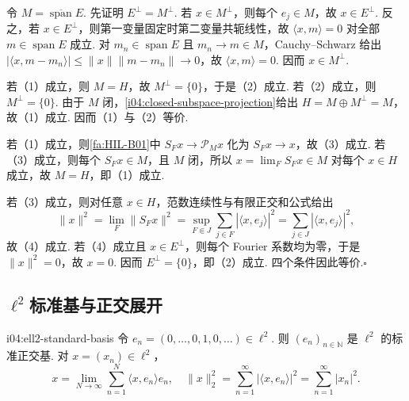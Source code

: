 \begin{FAProof}
令 \(\displaystyle M=\overline{\operatorname{span}}E\). 先证明 \(\displaystyle E^\perp=M^\perp\). 若 \(\displaystyle x\in M^\perp\)，则每个 \(\displaystyle e_j\in M\)，故 \(\displaystyle x\in E^\perp\). 反之，若 \(\displaystyle x\in E^\perp\)，则第一变量固定时第二变量共轭线性，故 \(\displaystyle \langle x,m\rangle=0\) 对全部 \(\displaystyle m\in\operatorname{span}E\) 成立. 对 \(\displaystyle m_n\in\operatorname{span}E\) 且 \(\displaystyle m_n\to m\in M\)，Cauchy--Schwarz 给出 \(\displaystyle |\langle x,m-m_n\rangle|\leqslant\|x\|\|m-m_n\|\to0\)，故 \(\displaystyle \langle x,m\rangle=0\). 因而 \(\displaystyle x\in M^\perp\).

若（1）成立，则 \(\displaystyle M=H\)，故 \(\displaystyle M^\perp=\{0\}\)，于是（2）成立. 若（2）成立，则 \(\displaystyle M^\perp=\{0\}\). 由于 \(\displaystyle M\) 闭，\autoref{i04:closed-subspace-projection}给出 \(\displaystyle H=M\oplus M^\perp=M\)，故（1）成立. 因而（1）与（2）等价.

若（1）成立，则\autoref{fa:HIL-B01}中 \(\displaystyle S_Fx\to\mathcal P_Mx\) 化为 \(\displaystyle S_Fx\to x\)，故（3）成立. 若（3）成立，则每个 \(\displaystyle S_Fx\in M\)，且 \(\displaystyle M\) 闭，所以 \(\displaystyle x=\lim_FS_Fx\in M\) 对每个 \(\displaystyle x\in H\) 成立，故 \(\displaystyle M=H\)，即（1）成立.

若（3）成立，则对任意 \(\displaystyle x\in H\)，范数连续性与有限正交和公式给出
\[
\|x\|^2
=\lim_F\|S_Fx\|^2
=\sup_{F\Subset J}\sum_{j\in F}|\langle x,e_j\rangle|^2
=\sum_{j\in J}|\langle x,e_j\rangle|^2,
\]
故（4）成立. 若（4）成立且 \(\displaystyle x\in E^\perp\)，则每个 Fourier 系数均为零，于是 \(\displaystyle \|x\|^2=0\)，故 \(\displaystyle x=0\). 因而 \(\displaystyle E^\perp=\{0\}\)，即（2）成立. 四个条件因此等价.\hfill\(\square\)

\end{FAProof}

\subsection{\texorpdfstring{\(\displaystyle\ell^2\)}{ℓ^2}标准基与正交展开}

\begin{FAProposition}{i04:ell2-standard-basis}
令 \(\displaystyle e_n=(0,\dots,0,1,0,\dots)\in\ell^2\). 则 \(\displaystyle (e_n)_{n\in\mathbb N}\) 是 \(\displaystyle \ell^2\) 的标准正交基. 对 \(\displaystyle x=(x_n)\in\ell^2\)，
\[
x=\lim_{N\to\infty}\sum_{n=1}^{N}\langle x,e_n\rangle e_n,
\quad
\|x\|_2^2=\sum_{n=1}^{\infty}|\langle x,e_n\rangle|^2=\sum_{n=1}^{\infty}|x_n|^2.
\]
\end{FAProposition}

